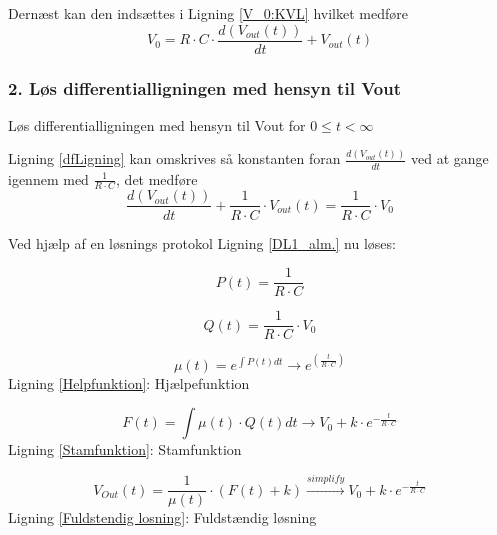 Dernæst kan den indsættes i Ligning \ref{V_0:KVL} hvilket medføre 
\begin{equation}
 V_{0}= R \cdot C \cdot \frac{d(V_{out}(t))}{dt} + V_{out}(t)
\end{equation}
	
\subsubsection*{2. Løs differentialligningen med hensyn til Vout }
 Løs differentialligningen med hensyn til Vout for $ 0\leq t<\infty$
 
 Ligning \ref{dfLigning} kan omskrives så konstanten foran $\frac{d(V_{out}(t))}{dt}$ ved at gange igennem med $\frac{1}{R \cdot C}$, det medføre 
\begin{equation}
\frac{d(V_{out}(t))}{dt}+\frac{1}{R \cdot C}\cdot V_{out}(t) =\frac{1}{R \cdot C} \cdot V_{0}
\label{DL1_alm.}
\end{equation} 

Ved hjælp af en løsnings protokol Ligning \ref{DL1_alm.} nu løses:

\begin{equation}
P(t) = \frac{1}{R \cdot C}
\end{equation}

\begin{equation}
Q(t) = \frac{1}{R \cdot C}\cdot V_{0}
\end{equation}

\begin{center}
\begin{equation}
\mu(t) = e^{\int{P(t) dt}}\rightarrow e^{(\frac{t}{R \cdot C})}
\label{Helpfunktion}
\end{equation}
Ligning \ref{Helpfunktion}: Hjælpefunktion
\end{center}

\begin{center}
\begin{equation}
F(t)=\int{\mu(t) \cdot Q(t) dt}\rightarrow V_{0}+k \cdot e^{-\frac{t}{R \cdot C}}
\label{Stamfunktion}
\end{equation}
Ligning \ref{Stamfunktion}: Stamfunktion
\end{center}

\begin{center}
\begin{equation}
V_{Out}(t) = \frac{1}{\mu(t)} \cdot (F(t)+k) \xrightarrow[ ]{simplify} V_{0}+k \cdot e^{-\frac{t}{R \cdot C}}
\label{Fuldstendig losning}
\end{equation}
Ligning \ref{Fuldstendig losning}: Fuldstændig løsning
\end{center}

